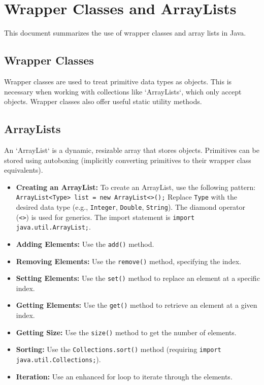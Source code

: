 \documentclass{article}
\begin{document}
\section{Wrapper Classes and ArrayLists}

This document summarizes the use of wrapper classes and array lists in Java.

\subsection{Wrapper Classes}

Wrapper classes are used to treat primitive data types as objects.  This is necessary when working with collections like `ArrayLists`, which only accept objects.  Wrapper classes also offer useful static utility methods.

\subsection{ArrayLists}

An `ArrayList` is a dynamic, resizable array that stores objects.  Primitives can be stored using autoboxing (implicitly converting primitives to their wrapper class equivalents).

\begin{itemize}
    \item \textbf{Creating an ArrayList:}  To create an ArrayList, use the following pattern:
    \texttt{ArrayList<Type> list = new ArrayList<>();}  Replace \texttt{Type} with the desired data type (e.g., \texttt{Integer}, \texttt{Double}, \texttt{String}).  The diamond operator (\texttt{<>}) is used for generics.  The import statement is \texttt{import java.util.ArrayList;}.
    \item \textbf{Adding Elements:} Use the \texttt{add()} method.
    \item \textbf{Removing Elements:} Use the \texttt{remove()} method, specifying the index.
    \item \textbf{Setting Elements:} Use the \texttt{set()} method to replace an element at a specific index.
    \item \textbf{Getting Elements:} Use the \texttt{get()} method to retrieve an element at a given index.
    \item \textbf{Getting Size:} Use the \texttt{size()} method to get the number of elements.
    \item \textbf{Sorting:} Use the \texttt{Collections.sort()} method (requiring \texttt{import java.util.Collections;}).
    \item \textbf{Iteration:} Use an enhanced for loop to iterate through the elements.
\end{itemize}
\end{document}
